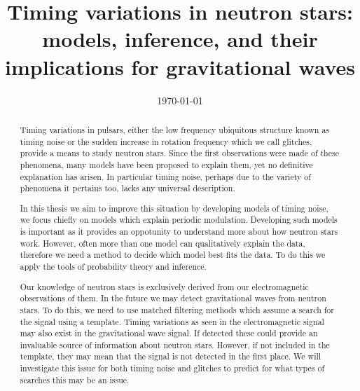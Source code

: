 \documentclass[twoside]{thesis}
\begin{document}
\def\biblio{}

\frontmatter
\title      {Timing variations in neutron stars: models, inference, and their
             implications for gravitational waves}
\date       {\today}
\subject    {}
\keywords   {}
\maketitle

\begin{abstract}

Timing variations in pulsars, either the low frequency ubiquitous structure
known as timing noise or the sudden increase in rotation frequency which we
call glitches, provide a means to study neutron stars. Since the first
observations were made of these phenomena, many models have been proposed to
explain them, yet no definitive explanation has arisen. In particular timing
noise, perhaps due to the variety of phenomena it pertains too, lacks any
universal description.

In this thesis we aim to improve this situation by developing models of timing
noise, we focus chiefly on models which explain periodic modulation. Developing
such models is important as it provides an oppotunity to understand more about
how neutron stars work. However, often more than one model can qualitatively
explain the data, therefore we need a method to decide which model best fits
the data. To do this we apply the tools of probability theory and inference.

Our knowledge of neutron stars is exclusively derived from our electromagnetic
observations of them. In the future we may detect gravitational waves from neutron
stars. To do this, we need to use matched filtering methods which assume a
search for the signal using a template. Timing variations as seen in the electromagnetic
signal may also exist in the gravitational wave signal. If detected these could
provide an invaluable source of information about neutron stars. However, if not
included in the template, they may mean that the signal is not detected in the
first place. We will investigate this issue for both timing noise and glitches
to predict for what types of searches this may be an issue.



\end{abstract}
\end{document}
